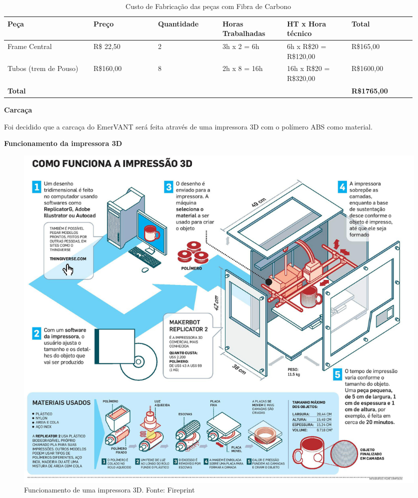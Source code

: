 \begin{table}[!h]
\centering
    \caption{Custo de Fabricação das peças com Fibra de Carbono}
\begin{tabular}{|p{0.20\linewidth}|p{0.15\linewidth}|p{0.15\linewidth}|p{0.15\linewidth}|p{0.15\linewidth}|p{0.15\linewidth}|}
\hline

Peça & Preço& Quantidade& Horas Trabalhadas &HT x Hora técnico& Total\\ \hline
Frame Central &R\$ 22,50& 2 &3h x 2 = 6h& 6h x R\$20 = R\$120,00& R\$165,00 \\ \hline
Tubos (trem de Pouso)& R\$160,00& 8 &2h x 8 = 16h &16h x R\$20 = R\$320,00& R\$1600,00\\ \hline
\textbf{Total} & & & & & \textbf{R\$1765,00}\\ \hline

\end{tabular}
    \label{custos_carregador}
\end{table}

\pagebreak
\indent \textbf{Carcaça}

Foi decidido que a carcaça do EmerVANT será feita através de uma impressora 3D
com o polímero ABS como material.

\indent \indent \textbf{Funcionamento da impressora 3D}

\begin{figure}[H]
    \centering
      \includegraphics[keepaspectratio=true,scale=0.25]{figuras/impressao3D.jpg}
    \caption{Funcionamento de uma impressora 3D. Fonte: Fireprint}
    \label{fig:impressao3D}
\end{figure}

